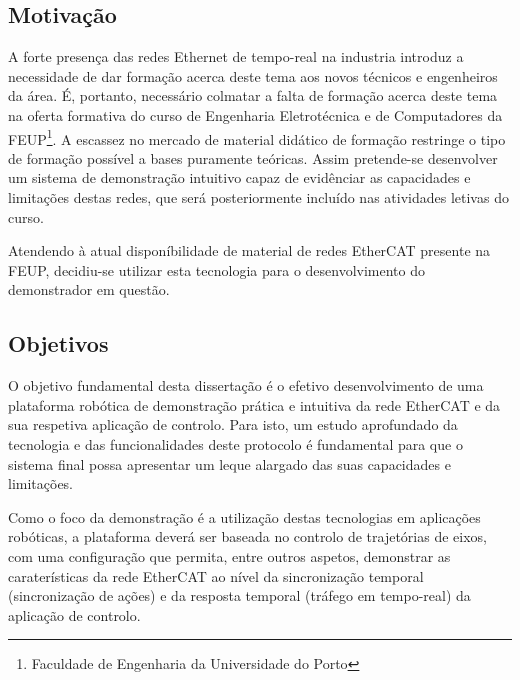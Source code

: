 % 

\subsection{Motivação}\label{sec:motivacao}

A forte presença das redes Ethernet de tempo-real na industria introduz a necessidade de dar formação acerca deste tema aos novos técnicos e engenheiros da área.
É, portanto, necessário colmatar a falta de formação acerca deste tema na oferta formativa do curso de Engenharia Eletrotécnica e de Computadores da FEUP\footnote{Faculdade de Engenharia da Universidade do Porto}.
A escassez no mercado de material didático de formação restringe o tipo de formação possível a bases puramente teóricas.
Assim pretende-se desenvolver um sistema de demonstração intuitivo capaz de evidênciar as capacidades e limitações destas redes, que será posteriormente incluído nas atividades letivas do curso.

Atendendo à atual disponíbilidade de material de redes EtherCAT presente na FEUP, decidiu-se utilizar esta tecnologia para o desenvolvimento do demonstrador em questão. 

% 
% 


\subsection{Objetivos}\label{sec:objetivos}

O objetivo fundamental desta dissertação é o efetivo desenvolvimento de uma plataforma robótica de demonstração prática e intuitiva da rede EtherCAT e da sua
respetiva aplicação de controlo.
Para isto, um estudo aprofundado da tecnologia e das funcionalidades deste protocolo é fundamental para que o sistema final possa apresentar um leque alargado
das suas capacidades e limitações.

Como o foco da demonstração é a utilização destas tecnologias em aplicações robóticas, a plataforma deverá ser baseada no controlo de trajetórias de eixos, com uma
configuração que permita, entre outros aspetos, demonstrar as caraterísticas da rede EtherCAT ao nível da sincronização temporal (sincronização de ações) e da resposta
temporal (tráfego em tempo-real) da aplicação de controlo.

